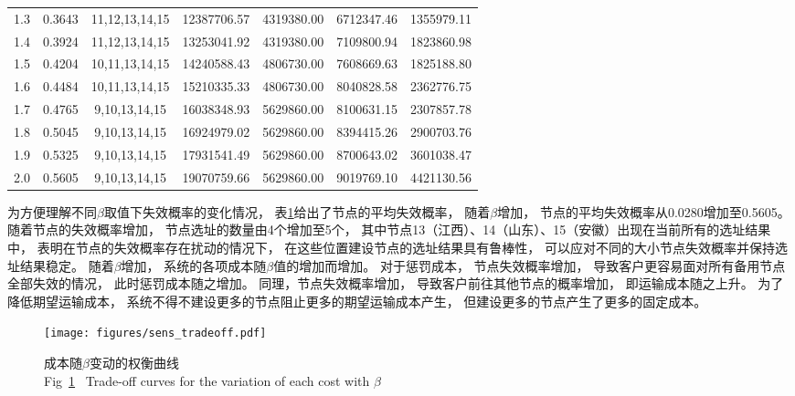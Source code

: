 \begin{table}[htbp]
\begin{tabular}{cccrccr}
        1.3   & 0.3643 & 11,12,13,14,15 & 12387706.57 & 4319380.00 & 6712347.46  & 1355979.11  \\
        1.4   & 0.3924 & 11,12,13,14,15 & 13253041.92 & 4319380.00 & 7109800.94  & 1823860.98  \\
        1.5   & 0.4204 & 10,11,13,14,15 & 14240588.43 & 4806730.00 & 7608669.63  & 1825188.80  \\
        1.6   & 0.4484 & 10,11,13,14,15 & 15210335.33 & 4806730.00 & 8040828.58  & 2362776.75  \\
        1.7   & 0.4765 & 9,10,13,14,15 & 16038348.93 & 5629860.00 & 8100631.15  & 2307857.78  \\
        1.8   & 0.5045 & 9,10,13,14,15 & 16924979.02 & 5629860.00 & 8394415.26  & 2900703.76  \\
        1.9   & 0.5325 & 9,10,13,14,15 & 17931541.49 & 5629860.00 & 8700643.02  & 3601038.47  \\
        2.0   & 0.5605 & 9,10,13,14,15 & 19070759.66 & 5629860.00 & 9019769.10  & 4421130.56  \\
        \bottomrule  
    \end{tabular}%
    \label{table:sens_prob}
\end{table}%

为方便理解不同$\beta$取值下失效概率的变化情况，
表\ref{table:sens_prob}给出了节点的平均失效概率，
随着$\beta$增加，
节点的平均失效概率从0.0280增加至0.5605。
随着节点的失效概率增加，
节点选址的数量由4个增加至5个，
其中节点13（江西）、14（山东）、15（安徽）出现在当前所有的选址结果中，
表明在节点的失效概率存在扰动的情况下，
在这些位置建设节点的选址结果具有鲁棒性，
可以应对不同的大小节点失效概率并保持选址结果稳定。
随着$\beta$增加，
系统的各项成本随$\beta$值的增加而增加。
对于惩罚成本，
节点失效概率增加，
导致客户更容易面对所有备用节点全部失效的情况，
此时惩罚成本随之增加。
同理，节点失效概率增加，
导致客户前往其他节点的概率增加，
即运输成本随之上升。
为了降低期望运输成本，
系统不得不建设更多的节点阻止更多的期望运输成本产生，
但建设更多的节点产生了更多的固定成本。

\begin{figure}[!hbt] %
	\setlength{\belowcaptionskip}{-0.5cm} 
	  \centering
	  \texttt{[image: figures/sens\_tradeoff.pdf]}
	  \caption{成本随$\beta$变动的权衡曲线\\
	  Fig~\ref{fig:sens_tradeoff}~ Trade-off curves for the variation of each cost with $\beta$}
	  \label{fig:sens_tradeoff}
\end{figure}

